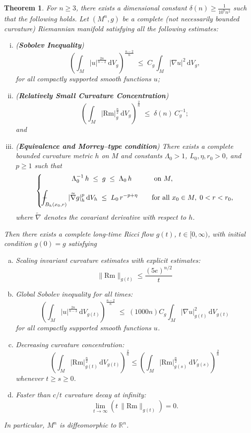 \documentclass{amsart}
\def\Xint#1{\mathchoice
{\XXint\displaystyle\textstyle{#1}}%
{\XXint\textstyle\scriptstyle{#1}}%
{\XXint\scriptstyle\scriptscriptstyle{#1}}%
{\XXint\scriptscriptstyle\scriptscriptstyle{#1}}%
\!\int}
\def\XXint#1#2#3{{\setbox0=\hbox{$#1{#2#3}{\int}$ }
\vcenter{\hbox{$#2#3$ }}\kern-.6\wd0}}
\def\dashint{\Xint-}
\newtheorem{thm}{Theorem}[section]
\theoremstyle{definition}
\newcommand{\Rm}{\mathrm{Rm}}
\newcommand{\dV}{\mathrm{d}V}
\begin{document}
\begin{thm}\label{thmmain}
For $n \ge 3$, there exists a dimensional constant $\delta(n) \geq \frac{1}{10^6 n^2}$ such that the following holds.  Let $(M^n,g)$ be a complete (not necessarily bounded curvature) Riemannian manifold satisfying all the following estimates:

\begin{enumerate}[(i)]
\item \label{SobMain} (\textbf{Sobolev Inequality})    
\[
\left( \int_M |u|^{\frac{2n}{n-2}}\, \dV_g \right)^{\frac{n-2}{n}}
\;\le\;
C_g \int_M |\nabla u|^2\,\dV_g ,
\]
for all compactly supported smooth functions $u$; 


\item  \label{CCmain}(\textbf{Relatively Small Curvature Concentration})   
\[
\left( \int_M |\Rm|_g^{\frac{n}{2}}\,\dV_g \right)^{\frac{2}{n}}
\;\le\;
\delta(n)\, C_g^{-1};
\]
and




\item \label{morreyiii}(\textbf{Equivalence and Morrey–type condition})  
There exists a complete bounded curvature metric $h$ on $M$  and 
constants $\Lambda_0>1$, $L_0,\eta,r_0>0$, and $p\ge 1$ such that
\[
\left\{
\begin{aligned}
\Lambda_0^{-1}\, & h \;\le\; g \;\le\; \Lambda_0\, h 
\quad &&\text{ on } M, \\[6pt]
\dashint_{B_h(x_0,r)} |\widetilde \nabla g|_h^p& \,\dV_h
\;\le\;
L_0\, r^{-p+\eta}
\quad &&\text{for all } x_0\in M,\; 0<r<r_0,
\end{aligned}
\right.
\]
where $\widetilde{\nabla}$ denotes the covariant derivative with respect to $h$.

\end{enumerate}




Then there exists a complete long-time Ricci flow $g(t)$, $t\in [0,\infty)$, with initial condition $g(0)=g$ satisfying

\begin{enumerate}[(a)]
    \item \label{thma}Scaling invariant curvature estimates with explicit estimates: 
    \[
    \|\Rm\|_{g(t)}\leq \frac{(5e)^{n/2}}{t}
    \]
    \item Global Sobolev inequality for all times:
    \[
        \left( \int_M |u|^{\frac{2n}{n-2}}\, \dV_{g(t)} \right)^{\frac{n-2}{n}}
\;\le\;
(1000 n) C_g \int_M |\nabla u|_{g(t)}^2\,\dV_{g(t)}
\]
for all compactly supported smooth functions $u$. 
\item Decreasing curvature concentration:
\[
\left( \int_M | \Rm|_{g(t)}^{\frac{n}{2}}\,\dV_{g(t)} \right)^{\frac{2}{n}}\leq \left( \int_M  | \Rm|_{g(s)}^{\frac{n}{2}}\,\dV_{g(s)} \right)^{\frac{2}{n}}
\]
whenever $t\geq s\geq 0$. 
\item \label{thmd}Faster than $c/t$ curvature decay at infinity:
\[
\lim_{t\to\infty} 
\left( t\, \|\Rm\|_{g(t)}\right)
=0.
\]
\end{enumerate}
In particular, $M^n$ is diffeomorphic to $\mathbb{R}^n$.
\end{thm}
\end{document}
